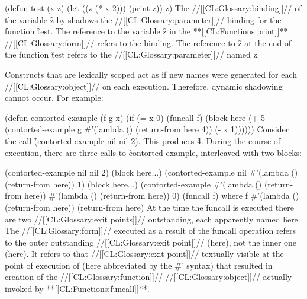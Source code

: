 \code
 (defun test (x z)
   (let ((z (* x 2)))
     (print z))
   z)
\endcode
The //[[CL:Glossary:binding]]// of the variable \f{z} by
 shadows
the //[[CL:Glossary:parameter]]// binding for the function \f{test}.  The reference to the
variable \f{z} in the **[[CL:Functions:print]]** //[[CL:Glossary:form]]// refers to the  binding.
The reference to \f{z} at the end of the function \f{test} 
refers to the //[[CL:Glossary:parameter]]// named \f{z}.



Constructs that are lexically scoped act as if new names were
generated for each //[[CL:Glossary:object]]// on each execution.  Therefore,
dynamic shadowing cannot occur.  For example:

\code
 (defun contorted-example (f g x)
   (if (= x 0)
       (funcall f)
       (block here
          (+ 5 (contorted-example g
                                  #'(lambda () (return-from here 4))
                                  (- x 1))))))
\endcode
Consider the call \f{(contorted-example nil nil 2)}.  This produces
\f{4}.  During the course of execution, there are three
calls to \f{contorted-example}, interleaved with two 
blocks:

\code
 (contorted-example nil nil 2)
   (block here\ssso ...)
     (contorted-example nil #'(lambda () (return-from here)) 1)
       (block here\ssst ...)
         (contorted-example #'(lambda () (return-from here))
                            #'(lambda () (return-from here))
                            0)
             (funcall f)
                    where f \EV #'(lambda () (return-from here))
                 (return-from here)
\endcode
At the time the \f{funcall} is executed
there are two  //[[CL:Glossary:exit points]]// outstanding, each apparently
named \f{here}.
The  //[[CL:Glossary:form]]// executed as a result of the \f{funcall}
operation
refers to the outer outstanding //[[CL:Glossary:exit point]]//
(here\ssso), not the
inner one (here\ssst).
It
refers to that //[[CL:Glossary:exit point]]// textually visible at the point of
execution of 
(here abbreviated by the \f{\#'} syntax) that resulted
in creation of the //[[CL:Glossary:function]]// //[[CL:Glossary:object]]// actually invoked by 
**[[CL:Functions:funcall]]**.                       


